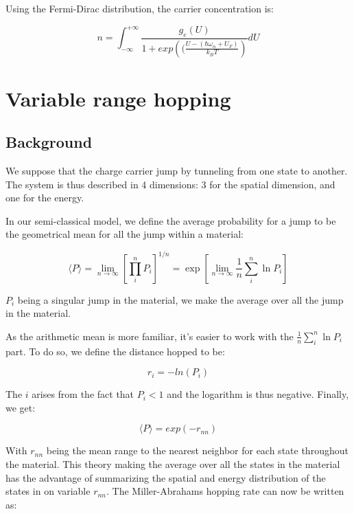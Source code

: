 Using the Fermi-Dirac distribution, the carrier concentration is:

\begin{equation}
    n = \int_{-\infty}^{+\infty}\frac{g_e(U)}{1 + exp\left((\frac{U - (\hbar \omega_\alpha + U_F)}{k_BT}\right)}d U
\end{equation}

\section{Variable range hopping}

\subsection{Background}
We suppose that the charge carrier jump by tunneling from one state to another. The system is thus described in 4 dimensions: 3 for the spatial dimension, and one for the energy.

In our semi-classical model, we define the average probability for a jump to be the geometrical mean for all the jump within a material:

\begin{equation}
    \langle P \rangle = \operatorname{lim}_{n \rightarrow \infty}\left[\prod_{i}^{n} P_{i}\right]^{1 / n}=\exp \left[\operatorname{lim}_{n \rightarrow \infty} \frac{1}{n} \sum_{i}^{n} \ln P_{i}\right]
\end{equation}

$P_i$ being a singular jump in the material, we make the average over all the jump in the material.

As the arithmetic mean is more familiar, it's easier to work with the $\frac{1}{n} \sum_{i}^{n} \ln P_{i}$ part. To do so, we define the distance hopped to be:

\begin{equation}
    r_i = -ln(P_i)
\end{equation}

The $i$ arises from the fact that $P_i < 1$ and the logarithm is thus negative. Finally, we get:

\begin{equation}
    \langle P \rangle = exp(-r_{nn})
\end{equation}

With $r_{nn}$ being the mean range to the nearest neighbor for each state throughout the material. This theory making the average over all the states in the material has the advantage of summarizing the spatial and energy distribution of the states in on variable $r_{nn}$. The Miller-Abrahams hopping rate can now be written as:

